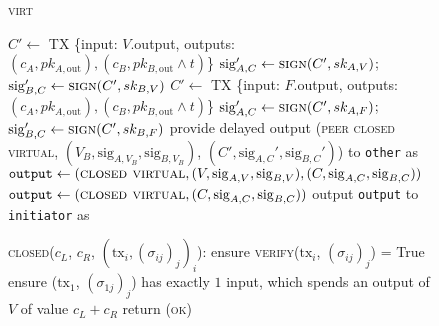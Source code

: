 \begin{figure}[H]
\begin{processbox}{\textsc{virt}}
\begin{algorithmic}[1]
              \State {}
              \State $C' \gets$ TX \{input: $V$.output, outputs: $(c_A, pk_{A,
              \mathrm{out}}), (c_B, pk_{B, \mathrm{out}} \wedge t)$\}
              \State $\mathrm{sig}_{A, C}' \gets \textsc{sign}(C', sk_{A, V})$;
              $\mathrm{sig}_{B, C}' \gets \textsc{sign}(C', sk_{B, V})$
            \Else \: 
              \State $C' \gets$ TX \{input: $F$.output, outputs: $(c_A, pk_{A,
              \mathrm{out}}), (c_B, pk_{B, \mathrm{out}} \wedge t)$\}
              \State $\mathrm{sig}_{A, C}' \gets \textsc{sign}(C', sk_{A, F})$;
              $\mathrm{sig}_{B, C}' \gets \textsc{sign}(C', sk_{B, F})$
            \EndIf
            \State provide delayed output (\textsc{peer closed virtual}, $(V_B,
            \mathrm{sig}_{A, V_B}, \mathrm{sig}_{B, V_B})$, $(C',
            \mathrm{sig}_{A, C}', \mathrm{sig}_{B, C}')$) to \texttt{other} as
            \bob
          \EndIf
            \State $\mathtt{output} \gets (\textsc{closed virtual}, (V,
            \mathrm{sig}_{A, V}, \mathrm{sig}_{B, V}), (C, \mathrm{sig}_{A, C},
            \mathrm{sig}_{B, C}))$
          \Else
            \State $\mathtt{output} \gets (\textsc{closed virtual}, (C,
            \mathrm{sig}_{A, C}, \mathrm{sig}_{B, C}))$
          \EndIf
          \State output \texttt{output} to \texttt{initiator} as \alice
        \EndIf
        \Statex

        \State \textsc{closed}($c_L$, $c_R$, $(\mathrm{tx}_i,
        (\sigma_{ij})_j)_i$):
        \Indent
            \State ensure \textsc{verify}($\mathrm{tx}_i$, $(\sigma_{ij})_j$) =
            True
          \EndFor
          \State ensure ($\mathrm{tx}_1$, $(\sigma_{1j})_j$) has exactly $1$
          input, which spends an output of $V$ of value $c_L + c_R$
          \State return (\textsc{ok})
        \EndIndent
    \end{algorithmic}
  \end{processbox}
  \caption{}
  \label{code:virtual-layer}
\end{figure}

